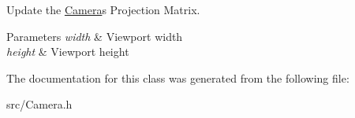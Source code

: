 Update the \mbox{\hyperlink{class_camera}{Camera}}\textquotesingle{}s Projection Matrix. 


\begin{DoxyParams}{Parameters}
{\em width} & Viewport width \\
\hline
{\em height} & Viewport height \\
\hline
\end{DoxyParams}


The documentation for this class was generated from the following file\+:\begin{DoxyCompactItemize}
\item 
src/Camera.\+h\end{DoxyCompactItemize}

